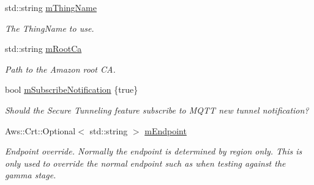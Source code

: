 \begin{DoxyCompactItemize}
\mbox{\label{class_aws_1_1_iot_1_1_device_client_1_1_secure_tunneling_1_1_secure_tunneling_feature_af374641c2f33bc8985af08b26d0fb6d1}} 
std\+::string \hyperlink{class_aws_1_1_iot_1_1_device_client_1_1_secure_tunneling_1_1_secure_tunneling_feature_af374641c2f33bc8985af08b26d0fb6d1}{m\+Thing\+Name}
\begin{DoxyCompactList}\small\item\em The Thing\+Name to use. \end{DoxyCompactList}\item 
\mbox{\label{class_aws_1_1_iot_1_1_device_client_1_1_secure_tunneling_1_1_secure_tunneling_feature_a1b59b829f560cebd8b58189bc0479f95}} 
std\+::string \hyperlink{class_aws_1_1_iot_1_1_device_client_1_1_secure_tunneling_1_1_secure_tunneling_feature_a1b59b829f560cebd8b58189bc0479f95}{m\+Root\+Ca}
\begin{DoxyCompactList}\small\item\em Path to the Amazon root CA. \end{DoxyCompactList}\item 
\mbox{\label{class_aws_1_1_iot_1_1_device_client_1_1_secure_tunneling_1_1_secure_tunneling_feature_a85ec525712376af69f99ae024a28fb55}} 
bool \hyperlink{class_aws_1_1_iot_1_1_device_client_1_1_secure_tunneling_1_1_secure_tunneling_feature_a85ec525712376af69f99ae024a28fb55}{m\+Subscribe\+Notification} \{true\}
\begin{DoxyCompactList}\small\item\em Should the Secure Tunneling feature subscribe to M\+Q\+TT new tunnel notification? \end{DoxyCompactList}\item 
\mbox{\label{class_aws_1_1_iot_1_1_device_client_1_1_secure_tunneling_1_1_secure_tunneling_feature_a214e9168c8d239bd8d33c4bfe33fce95}} 
Aws\+::\+Crt\+::\+Optional$<$ std\+::string $>$ \hyperlink{class_aws_1_1_iot_1_1_device_client_1_1_secure_tunneling_1_1_secure_tunneling_feature_a214e9168c8d239bd8d33c4bfe33fce95}{m\+Endpoint}
\begin{DoxyCompactList}\small\item\em Endpoint override. Normally the endpoint is determined by {\ttfamily region} only. This is only used to override the normal endpoint such as when testing against the gamma stage. \end{DoxyCompactList}\item 

\end{DoxyCompactItemize}
